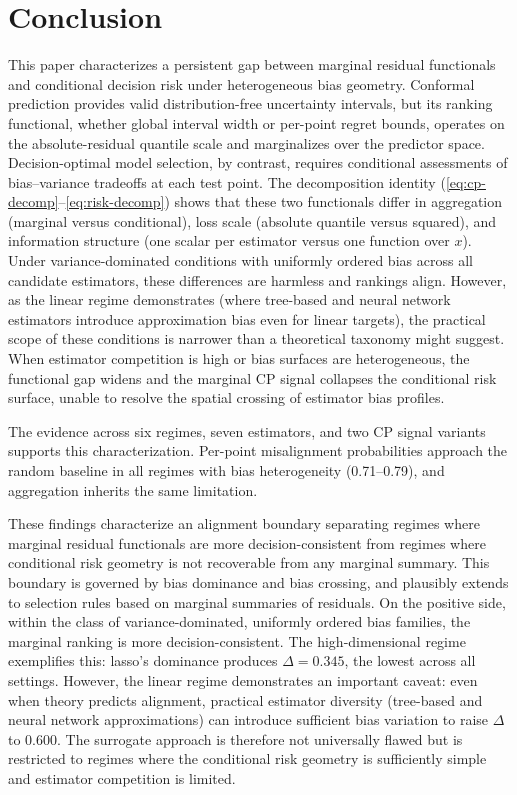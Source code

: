 \documentclass[pdflatex,sn-mathphys-ay]{sn-jnl}%
\theoremstyle{thmstyleone}%
\theoremstyle{thmstyletwo}%
\theoremstyle{thmstylethree}%
\begin{document}
\section{Conclusion}
\label{sec:conclusion}

This paper characterizes a persistent gap between marginal residual functionals and conditional decision risk under heterogeneous bias geometry. Conformal prediction provides valid distribution-free uncertainty intervals, but its ranking functional, whether global interval width or per-point regret bounds, operates on the absolute-residual quantile scale and marginalizes over the predictor space. Decision-optimal model selection, by contrast, requires conditional assessments of bias--variance tradeoffs at each test point. The decomposition identity (\eqref{eq:cp-decomp}--\eqref{eq:risk-decomp}) shows that these two functionals differ in aggregation (marginal versus conditional), loss scale (absolute quantile versus squared), and information structure (one scalar per estimator versus one function over $x$). Under variance-dominated conditions with uniformly ordered bias across all candidate estimators, these differences are harmless and rankings align. However, as the linear regime demonstrates (where tree-based and neural network estimators introduce approximation bias even for linear targets), the practical scope of these conditions is narrower than a theoretical taxonomy might suggest. When estimator competition is high or bias surfaces are heterogeneous, the functional gap widens and the marginal CP signal collapses the conditional risk surface, unable to resolve the spatial crossing of estimator bias profiles.

The evidence across six regimes, seven estimators, and two CP signal variants supports this characterization. Per-point misalignment probabilities approach the random baseline in all regimes with bias heterogeneity (0.71--0.79), and aggregation inherits the same limitation.

These findings characterize an alignment boundary separating regimes where marginal residual functionals are more decision-consistent from regimes where conditional risk geometry is not recoverable from any marginal summary. This boundary is governed by bias dominance and bias crossing, and plausibly extends to selection rules based on marginal summaries of residuals. On the positive side, within the class of variance-dominated, uniformly ordered bias families, the marginal ranking is more decision-consistent. The high-dimensional regime exemplifies this: lasso's dominance produces $\Delta = 0.345$, the lowest across all settings. However, the linear regime demonstrates an important caveat: even when theory predicts alignment, practical estimator diversity (tree-based and neural network approximations) can introduce sufficient bias variation to raise $\Delta$ to 0.600. The surrogate approach is therefore not universally flawed but is restricted to regimes where the conditional risk geometry is sufficiently simple and estimator competition is limited.
\end{document}
